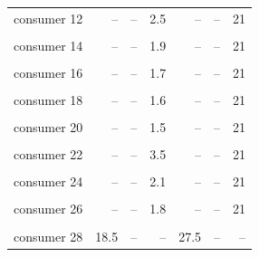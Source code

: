 \documentclass[APA,TimesLARGE]{WileyNJDv5} %
\begin{document}
\begin{table}[!h]
{\begin{tabular}[t]{lrrrrrr}
consumer  12 & – & – & 2.5 & – & – & 21\\
\cellcolor{gray!10}{consumer  13} & \cellcolor{gray!10}{–} & \cellcolor{gray!10}{–} & \cellcolor{gray!10}{2.3} & \cellcolor{gray!10}{–} & \cellcolor{gray!10}{–} & \cellcolor{gray!10}{21}\\
consumer  14 & – & – & 1.9 & – & – & 21\\
\cellcolor{gray!10}{consumer  15} & \cellcolor{gray!10}{–} & \cellcolor{gray!10}{–} & \cellcolor{gray!10}{2.7} & \cellcolor{gray!10}{–} & \cellcolor{gray!10}{–} & \cellcolor{gray!10}{21}\\
\addlinespace
consumer  16 & – & – & 1.7 & – & – & 21\\
\cellcolor{gray!10}{consumer  17} & \cellcolor{gray!10}{–} & \cellcolor{gray!10}{–} & \cellcolor{gray!10}{1.9} & \cellcolor{gray!10}{–} & \cellcolor{gray!10}{–} & \cellcolor{gray!10}{21}\\
consumer  18 & – & – & 1.6 & – & – & 21\\
\cellcolor{gray!10}{consumer  19} & \cellcolor{gray!10}{–} & \cellcolor{gray!10}{–} & \cellcolor{gray!10}{1.5} & \cellcolor{gray!10}{–} & \cellcolor{gray!10}{–} & \cellcolor{gray!10}{21}\\
consumer  20 & – & – & 1.5 & – & – & 21\\
\addlinespace
\cellcolor{gray!10}{consumer  21} & \cellcolor{gray!10}{–} & \cellcolor{gray!10}{–} & \cellcolor{gray!10}{1.8} & \cellcolor{gray!10}{–} & \cellcolor{gray!10}{–} & \cellcolor{gray!10}{21}\\
consumer  22 & – & – & 3.5 & – & – & 21\\
\cellcolor{gray!10}{consumer  23} & \cellcolor{gray!10}{–} & \cellcolor{gray!10}{–} & \cellcolor{gray!10}{1.6} & \cellcolor{gray!10}{–} & \cellcolor{gray!10}{–} & \cellcolor{gray!10}{21}\\
consumer  24 & – & – & 2.1 & – & – & 21\\
\cellcolor{gray!10}{consumer  25} & \cellcolor{gray!10}{–} & \cellcolor{gray!10}{–} & \cellcolor{gray!10}{4.5} & \cellcolor{gray!10}{–} & \cellcolor{gray!10}{–} & \cellcolor{gray!10}{21}\\
\addlinespace
consumer  26 & – & – & 1.8 & – & – & 21\\
\cellcolor{gray!10}{consumer  27} & \cellcolor{gray!10}{–} & \cellcolor{gray!10}{–} & \cellcolor{gray!10}{3.2} & \cellcolor{gray!10}{–} & \cellcolor{gray!10}{–} & \cellcolor{gray!10}{21}\\
consumer  28 & 18.5 & – & – & 27.5 & – & –\\
\bottomrule
\end{tabular}}
\end{table}
\end{document}
